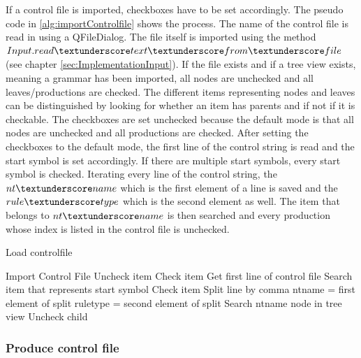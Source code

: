 If a control file is imported, checkboxes have to be set accordingly. The pseudo code in \ref{alg:importControlfile} shows the process. 
The name of the control file is read in using a QFileDialog. The file itself is imported using the method $Input.read\textunderscore text\textunderscore from\textunderscore file$ (see chapter \ref{sec:ImplementationInput}). If the file exists and if a tree view exists, meaning a grammar has been imported, all nodes are unchecked and all leaves/productions are checked. The different items representing nodes and leaves can be distinguished by looking for whether an item has parents and if not if it is checkable. The checkboxes are set unchecked because the default mode is that all nodes are unchecked and all productions are checked.  
After setting the checkboxes to the default mode, the first line of the control string is read and the start symbol is set accordingly. If there are multiple start symbols, every start symbol is checked.
Iterating every line of the control string, the $nt\textunderscore name$ which is the first element of a line is saved and the $rule\textunderscore type$ which is the second element as well. The item that belongs to $nt\textunderscore name$ is then searched and every production whose index is listed in the control file is unchecked.

\begin{algorithm}[H]
\caption{Load controlfile}
\label{alg:importControlfile}
\begin{algorithmic}[1] 
\State Import Control File
			\State Uncheck item
		\EndIf
	\Else
		\State Check item 
	\EndIf
\EndFor
\State Get first line of control file
\State Search item that represents start symbol 
\State Check item
	\State Split line by comma
	\State nt\textunderscore name = first element of split
	\State rule\textunderscore type = second element of split
	\State Search nt\textunderscore name node in tree view
				\State Uncheck child
			\EndIf
		\EndFor
	\EndIf 
\EndFor
\EndIf
\end{algorithmic}
\end{algorithm} 

\subsubsection{Produce control file}\label{sec:ImplementationGUIProduceControlFile}

